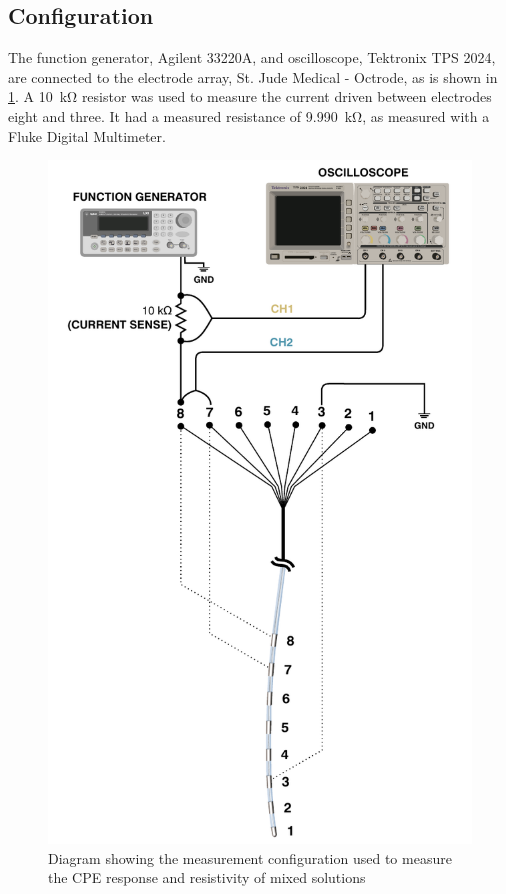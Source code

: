 \subsection{Configuration}

The function generator, Agilent 33220A, and oscilloscope, Tektronix TPS 2024, are connected to the electrode array, St. Jude Medical - Octrode, as is shown in \cref{fig:creatingCSF_setup}.
A \SI{10}{\kilo\ohm} resistor was used to measure the current driven between electrodes eight and three.
It had a measured resistance of \SI{9.990}{\kilo\ohm}, as measured with a Fluke Digital Multimeter.

\begin{figure}
    \centering
    \includegraphics{content/pt2/graphics/CreatingCSF_setup}
    \caption{\label{fig:creatingCSF_setup}Diagram showing the measurement configuration used to measure the CPE response and resistivity of mixed solutions}
\end{figure}

